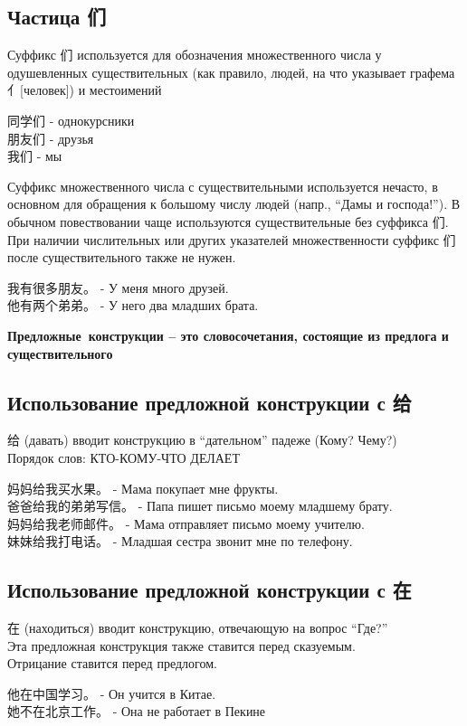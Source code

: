 \subsection{Частица 们}
Суффикс 们 используется для обозначения множественного числа у одушевленных существительных (как правило, людей, на что указывает графема 亻[человек]) и местоимений
\begin{example}\hfill \break \LARGE
	同学们 - однокурсники\\
	朋友们 - друзья\\
	我们 - мы\\
\end{example}
Суффикс множественного числа с существительными используется нечасто, в основном для
обращения к большому числу людей (напр., “Дамы и господа!”). В обычном повествовании
чаще используются существительные без суффикса 们. При наличии числительных или других
указателей множественности суффикс 们 после существительного также не нужен.
\begin{example}\hfill \break \LARGE
	我有很多朋友。 - У меня много друзей.\\
	他有两个弟弟。 - У него два младших брата.
\end{example}


\textbf{Предложные\ конструкции – это словосочетания, состоящие из предлога и существительного}

\subsection{Использование предложной конструкции с 给}
给 (давать) вводит конструкцию в “дательном” падеже (Кому? Чему?)\\
Порядок слов: КТО-КОМУ-ЧТО ДЕЛАЕТ
\begin{example}\hfill \break \LARGE
	妈妈给我买水果。 - Мама покупает мне фрукты.\\
	爸爸给我的弟弟写信。 - Папа пишет письмо моему младшему брату.\\
	妈妈给我老师邮件。 - Мама отправляет письмо моему учителю.\\
	妹妹给我打电话。 - Младшая сестра звонит мне по телефону.
\end{example}


\subsection{Использование предложной конструкции с 在}
在 (находиться) вводит конструкцию, отвечающую на вопрос “Где?”\\
Эта предложная конструкция также ставится перед сказуемым.\\
Отрицание ставится перед предлогом.
\begin{example}\hfill \break \LARGE
	他在中国学习。 - Он учится в Китае.\\
	她不在北京工作。 - Она не работает в Пекине
\end{example}